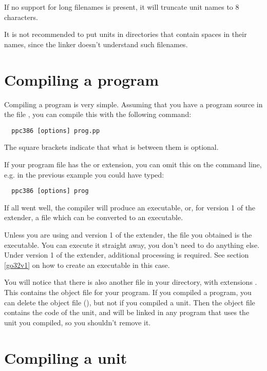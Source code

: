 \documentclass{book}
\begin{document}
If no support for long filenames is present, it will truncate unit names
to 8 characters.

It is not recommended to put units in directories that contain spaces in
their names, since the linker doesn't understand such filenames.

\section{Compiling a program}
Compiling a program is very simple. Assuming that you have a program source
in the file , you can compile this with the following command:
\begin{verbatim}
  ppc386 [options] prog.pp
\end{verbatim}
The square brackets \var{[\ ]} indicate that what is between them is optional.

If your program file has the  or  extension,
you can omit this on the command line, e.g. in the previous example you
could have typed:
\begin{verbatim}
  ppc386 [options] prog
\end{verbatim}

If all went well, the compiler will produce an executable, or, for version 1
of the \dos extender, a file which can be converted to an executable.

Unless you are using \dos and version 1 of the \dos extender,
the file you obtained is the executable.
You can execute it straight away, you don't need to do
anything else. Under version 1 of the \dos extender,
additional processing is required. See section \ref{go32v1} on how to
create an executable in this case.

You will notice that there is also another file in your directory, with
extensions . This contains the object file for your program.
If you compiled a program, you can delete the object file (),
but not if you compiled a unit.
Then the object file contains the code of the unit, and will be
linked in any program that uses the unit you compiled, so you shouldn't
remove it.


\section{Compiling a unit}
\end{document}
